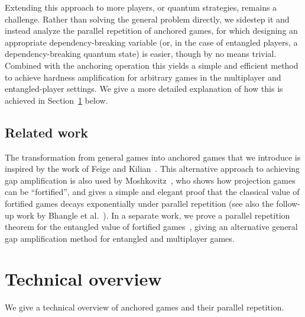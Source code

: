Extending this approach to more players, or quantum strategies, remains a challenge. Rather than solving the general problem directly, we sidestep it and instead analyze the parallel repetition of anchored games, for which designing an appropriate dependency-breaking variable (or, in the case of entangled players, a dependency-breaking quantum state) is easier, though by no means trivial. Combined with the anchoring operation this yields a simple and efficient method to achieve hardness amplification for arbitrary games in the multiplayer and entangled-player settings. We give a more detailed explanation of how this is achieved in Section~\ref{sec:anchorpr_technical} below.

 \subsection{Related work}\label{sec:related}


The transformation from general games into anchored games that we introduce is inspired by the work of Feige and Kilian~\cite{feige2000two}. This alternative approach to achieving gap amplification is also used by Moshkovitz~\cite{moshkovitz2014parallel}, who shows how projection games can be ``fortified'', and gives a simple and elegant proof that the classical value of fortified games decays exponentially under parallel repetition (see also the follow-up work by Bhangle  et al.~\cite{BSVV}). In a separate work, we prove a parallel repetition theorem for the entangled value of fortified games~\cite{bavarian2016parallel}, giving an alternative general gap amplification method for entangled and multiplayer games.




\section{Technical overview}
\label{sec:anchorpr_technical} 

We give a technical overview of anchored games and their parallel repetition. %

